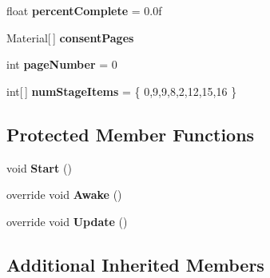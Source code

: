 \begin{DoxyCompactItemize}
\item 
float {\bfseries percent\+Complete} = 0.\+0f\hypertarget{class_object_message_handler_a1913e81a3a86dd4a143a65b6688fc2b2}{}\label{class_object_message_handler_a1913e81a3a86dd4a143a65b6688fc2b2}

\item 
Material\mbox{[}$\,$\mbox{]} {\bfseries consent\+Pages}\hypertarget{class_object_message_handler_a5ff45fd9062501484f35355c63a84ae5}{}\label{class_object_message_handler_a5ff45fd9062501484f35355c63a84ae5}

\item 
int {\bfseries page\+Number} = 0\hypertarget{class_object_message_handler_a708fc3d093850adffdf9aa8bdf726e23}{}\label{class_object_message_handler_a708fc3d093850adffdf9aa8bdf726e23}

\item 
int\mbox{[}$\,$\mbox{]} {\bfseries num\+Stage\+Items} = \{ 0,9,9,8,2,12,15,16 \}\hypertarget{class_object_message_handler_ac794463f06178e9da9388f3ab1c9e562}{}\label{class_object_message_handler_ac794463f06178e9da9388f3ab1c9e562}

\end{DoxyCompactItemize}
\subsection*{Protected Member Functions}
\begin{DoxyCompactItemize}
\item 
void {\bfseries Start} ()\hypertarget{class_object_message_handler_ae2702dc25ed0419a697efe422a3e4e6d}{}\label{class_object_message_handler_ae2702dc25ed0419a697efe422a3e4e6d}

\item 
override void {\bfseries Awake} ()\hypertarget{class_object_message_handler_aab9734b1f5f4513a82a46d293512eae4}{}\label{class_object_message_handler_aab9734b1f5f4513a82a46d293512eae4}

\item 
override void {\bfseries Update} ()\hypertarget{class_object_message_handler_a6c4bcd52e0254dae9df5e4fd4b3d9ba2}{}\label{class_object_message_handler_a6c4bcd52e0254dae9df5e4fd4b3d9ba2}

\end{DoxyCompactItemize}
\subsection*{Additional Inherited Members}


